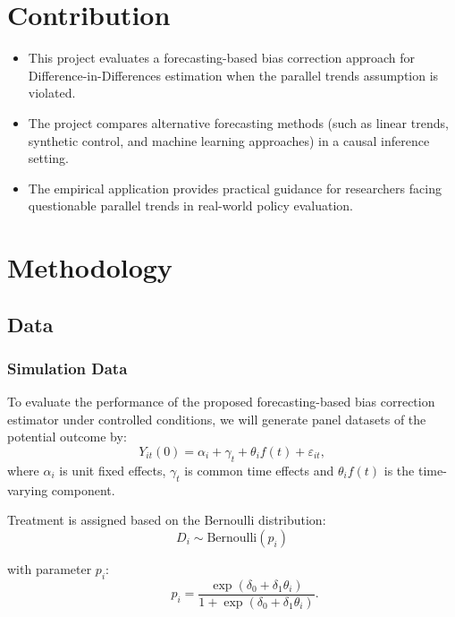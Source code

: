 \documentclass[12pt]{article}
\begin{document}
\section{Contribution}

\begin{itemize}
    \item This project evaluates a forecasting-based bias correction approach for Difference-in-Differences estimation when the parallel trends assumption is violated.
    \item The project compares alternative forecasting methods (such as linear trends, synthetic control, and machine learning approaches) in a causal inference setting.
    \item The empirical application provides practical guidance for researchers facing questionable parallel trends in real-world policy evaluation.
\end{itemize}
 
\section{Methodology}

\subsection{Data}

\subsubsection{Simulation Data}

To evaluate the performance of the proposed forecasting-based bias correction estimator under controlled conditions, we will generate panel datasets of the potential outcome by:
\begin{equation}
    Y_{it}(0) = \alpha_i + \gamma_t + \theta_i f(t) + \varepsilon_{it},
    \label{eq:placeholder_label}
\end{equation}
where \(\alpha_i\) is unit fixed effects,  \(\gamma_t\) is common time effects and  \(\theta_i f(t)\) is the time-varying component.

Treatment is assigned based on the Bernoulli distribution:
\begin{equation}
    D_i \sim \text{Bernoulli}(p_i)
\end{equation}

with parameter \(p_i\):
\begin{equation}
 \qquad
    p_i = \frac{\exp(\delta_0 + \delta_1 \theta_i)}{1 + \exp(\delta_0 + \delta_1 \theta_i)}.
    \label{eq:placeholder_label}
\end{equation}
\end{document}
